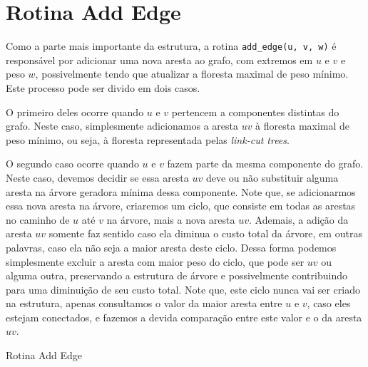 \section{Rotina Add Edge}
\label{sec:imsf-add-edge}

Como a parte mais importante da estrutura, a rotina \texttt{add\_edge(u, v, w)} é responsável por adicionar uma nova aresta ao grafo, com extremos em $u$ e $v$ e peso $w$, possivelmente tendo que atualizar a floresta maximal de peso mínimo. Este processo pode ser divido em dois casos.

O primeiro deles ocorre quando $u$ e $v$ pertencem a componentes distintas do grafo. Neste caso, simplesmente adicionamos a aresta $uv$ à floresta maximal de peso mínimo, ou seja, à floresta representada pelas \emph{link-cut trees}.

O segundo caso ocorre quando $u$ e $v$ fazem parte da mesma componente do grafo. Neste caso, devemos decidir se essa aresta $uv$ deve ou não substituir alguma aresta na árvore geradora mínima dessa componente. Note que, se adicionarmos essa nova aresta na árvore, criaremos um ciclo, que consiste em todas as arestas no caminho de $u$ até $v$ na árvore, mais a nova aresta $uv$. Ademais, a adição da aresta $uv$ somente faz sentido caso ela diminua o custo total da árvore, em outras palavras, caso ela não seja a maior aresta deste ciclo. Dessa forma podemos simplesmente excluir a aresta com maior peso do ciclo, que pode ser $uv$ ou alguma outra, preservando a estrutura de árvore e possivelmente contribuindo para uma diminuição de seu custo total. Note que, este ciclo nunca vai ser criado na estrutura, apenas consultamos o valor da maior aresta entre $u$ e $v$, caso eles estejam conectados, e fazemos a devida comparação entre este valor e o da aresta $uv$.

\begin{algorithm}[h!]
    \caption{Rotina Add Edge}\label{imsf-add-edge}
    \begin{algorithmic}[1]
        \EndIf
        \EndFunction
    \end{algorithmic}
\end{algorithm}

